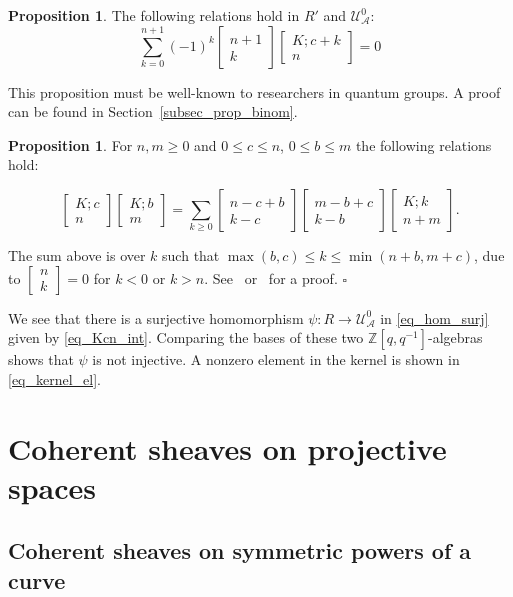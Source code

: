 \documentclass{article}
\def\lra{\longrightarrow}
\def\Z{\mathbb Z}
\newcommand{\mcA}{\mathcal{A}}
\newcommand{\UzeroA}{\mathcal{U}^0_{\mcA}}
\newcommand{\bbinom}[2]{
  \begin{bmatrix}
    #1 \\
    #2
  \end{bmatrix}
}
\newcommand{\bmat}[3]{
  \begin{bmatrix}
    #1 ; #2 \\
    #3
  \end{bmatrix}
}
\theoremstyle{definition}
\newtheorem{prop}[thm]{Proposition}
\theoremstyle{definition}
\begin{document}
\begin{prop}\label{prop_binom}
    The following relations hold in $R'$ and $\UzeroA$:
\begin{equation}\label{eq_q_binom_2}
    \sum_{k=0}^{n+1} (-1)^k \bbinom{n+1}{k} \bmat{K}{c+k}{n} =0
\end{equation}
\end{prop}
This proposition must be well-known to researchers in quantum groups. A proof can be found in Section~\ref{subsec_prop_binom}.


\begin{prop}
For $n,m\ge 0$ and $0\le c\le n$, $0\le b\le m$
    the following relations hold:

\begin{equation}\label{eq_multiplication_2}
\bmat{K}{c}{n} \bmat{K}{b}{m} = \sum_{k \ge 0} \begin{bmatrix} n - c + b \\ k - c \end{bmatrix} \begin{bmatrix} m - b + c \\ k - b \end{bmatrix}
\bmat{K}{k}{n+m}.
\end{equation}
\end{prop}
The sum above is over $k$ such that $\max(b,c) \le k \le  \min(n+b, m+c)$, due to $\begin{bmatrix} n \\ k \end{bmatrix}=0$ for $k<0$ or $k>n$. See~\cite[Theorem 1.2]{GMSW2} or~\cite{MartinezRuiz2025}
for a proof.
$\square$

We see that there is a surjective homomorphism $\psi:R\lra \UzeroA$ in \eqref{eq_hom_surj} given by \eqref{eq_Kcn_int}. Comparing the bases of these two $\Z[q,q^{-1}]$-algebras shows that $\psi$ is not injective. A nonzero element in the kernel is shown in \eqref{eq_kernel_el}.


%
%

\section{Coherent sheaves on projective spaces}
\label{sec_coherent}

\subsection{Coherent sheaves on symmetric powers of a curve}
\end{document}

